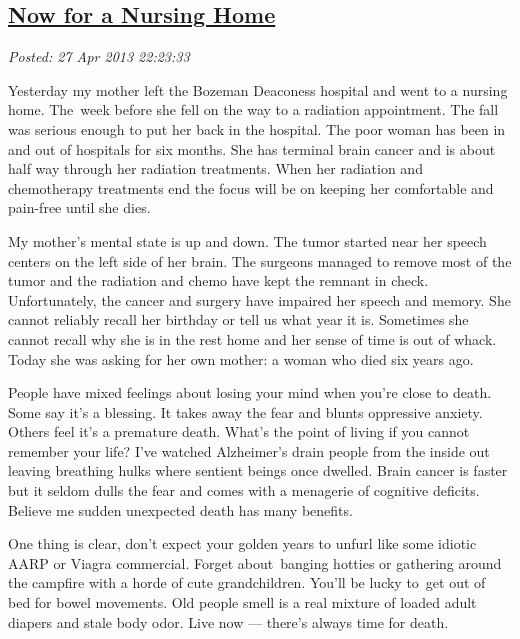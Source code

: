 %

\subsection*{\href{http://bakerjd99.wordpress.com/2013/04/27/now-for-a-nursing-home/}{Now for a Nursing Home}}


\noindent\emph{Posted: 27 Apr 2013 22:23:33}
\vspace{6pt}

Yesterday my mother left the Bozeman Deaconess hospital and went to a
nursing home. The~week before she fell on the way to a radiation
appointment. The fall was serious enough to put her back in the
hospital. The poor woman has been in and out of hospitals for six
months. She has terminal brain cancer and is about half way through her
radiation treatments. When her radiation and chemotherapy treatments end
the focus will be on keeping her comfortable and pain-free until she
dies.

My mother's mental state is up and down. The tumor started near her
speech centers on the left side of her brain. The surgeons managed to
remove most of the tumor and the radiation and chemo have kept the
remnant in check. Unfortunately, the cancer and surgery have impaired
her speech and memory. She cannot reliably recall her birthday or tell
us what year it is. Sometimes she cannot recall why she is in the rest
home and her sense of time is out of whack. Today she was asking for her
own mother: a woman who died six years ago.

People have mixed feelings about losing your mind when you're close to
death. Some say it's a blessing. It takes away the fear and blunts
oppressive anxiety. Others feel it's a premature death. What's the point
of living if you cannot remember your life? I've watched Alzheimer's
drain people from the inside out leaving breathing hulks where sentient
beings once dwelled. Brain cancer is faster but it seldom dulls the fear
and comes with a menagerie of cognitive deficits. Believe me sudden
unexpected death has many benefits.

One thing is clear, don't expect your golden years to unfurl like some
idiotic AARP or Viagra commercial. Forget about~banging hotties or
gathering around the campfire with a horde of cute grandchildren. You'll
be lucky to~get out of bed for bowel movements. Old people smell is a
real mixture of loaded adult diapers and stale body odor. Live now ---
there's always time for death.



%